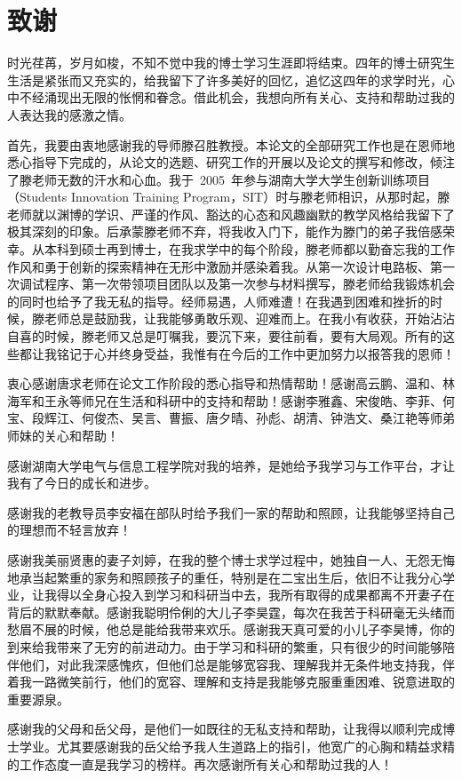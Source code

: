 
\chapter*{致\quad 谢}
时光荏苒，岁月如梭，不知不觉中我的博士学习生涯即将结束。四年的博士研究生生活是紧张而又充实的，给我留下了许多美好的回忆，追忆这四年的求学时光，心中不经涌现出无限的怅惘和眷念。借此机会，我想向所有关心、支持和帮助过我的人表达我的感激之情。

首先，我要由衷地感谢我的导师滕召胜教授。本论文的全部研究工作也是在恩师地悉心指导下完成的，从论文的选题、研究工作的开展以及论文的撰写和修改，倾注了滕老师无数的汗水和心血。我于~2005~年参与湖南大学大学生创新训练项目（Students Innovation Training Program，SIT）时与滕老师相识，从那时起，滕老师就以渊博的学识、严谨的作风、豁达的心态和风趣幽默的教学风格给我留下了极其深刻的印象。后承蒙滕老师不弃，将我收入门下，能作为滕门的弟子我倍感荣幸。从本科到硕士再到博士，在我求学中的每个阶段，滕老师都以勤奋忘我的工作作风和勇于创新的探索精神在无形中激励并感染着我。从第一次设计电路板、第一次调试程序、第一次带领项目团队以及第一次参与材料撰写，滕老师给我锻炼机会的同时也给予了我无私的指导。经师易遇，人师难遭！在我遇到困难和挫折的时候，滕老师总是鼓励我，让我能够勇敢乐观、迎难而上。在我小有收获，开始沾沾自喜的时候，滕老师又总是叮嘱我，要沉下来，要往前看，要有大局观。所有的这些都让我铭记于心并终身受益，我惟有在今后的工作中更加努力以报答我的恩师！

衷心感谢唐求老师在论文工作阶段的悉心指导和热情帮助！感谢高云鹏、温和、林海军和王永等师兄在生活和科研中的支持和帮助！感谢李雅鑫、宋俊皓、李菲、何宝、段辉江、何俊杰、吴言、曹振、唐夕晴、孙彪、胡清、钟浩文、桑江艳等师弟师妹的关心和帮助！

感谢湖南大学电气与信息工程学院对我的培养，是她给予我学习与工作平台，才让我有了今日的成长和进步。

感谢我的老教导员李安福在部队时给予我们一家的帮助和照顾，让我能够坚持自己的理想而不轻言放弃！

感谢我美丽贤惠的妻子刘婷，在我的整个博士求学过程中，她独自一人、无怨无悔地承当起繁重的家务和照顾孩子的重任，特别是在二宝出生后，依旧不让我分心学业，让我得以全身心投入到学习和科研当中去，我所有取得的成果都离不开妻子在背后的默默奉献。感谢我聪明伶俐的大儿子李昊霆，每次在我苦于科研毫无头绪而愁眉不展的时候，他总是能给我带来欢乐。感谢我天真可爱的小儿子李昊博，你的到来给我带来了无穷的前进动力。由于学习和科研的繁重，只有很少的时间能够陪伴他们，对此我深感愧疚，但他们总是能够宽容我、理解我并无条件地支持我，伴着我一路微笑前行，他们的宽容、理解和支持是我能够克服重重困难、锐意进取的重要源泉。

感谢我的父母和岳父母，是他们一如既往的无私支持和帮助，让我得以顺利完成博士学业。尤其要感谢我的岳父给予我人生道路上的指引，他宽广的心胸和精益求精的工作态度一直是我学习的榜样。再次感谢所有关心和帮助过我的人！







